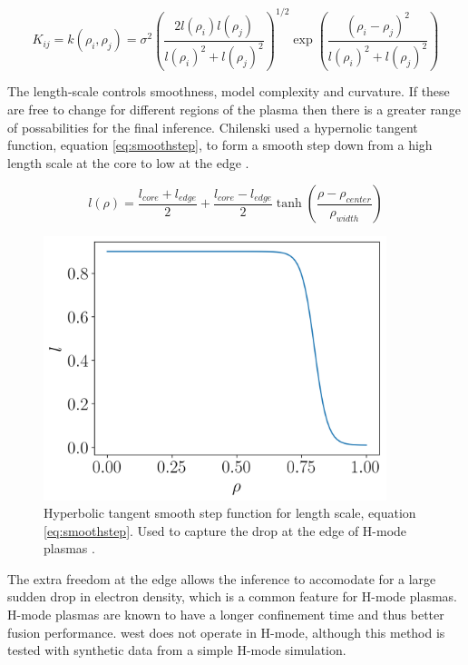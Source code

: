 \begin{equation}
  K_{ij} = k(\rho_i, \rho_j) = \sigma^2 \left( \frac{2l(\rho_i)l(\rho_j)}{l(\rho_i)^2 + l(\rho_j)^2} \right)^{1/2} \exp\left({\frac{(\rho_i - \rho_j)^2}{l(\rho_i)^2+l(\rho_j)^2}}\right)
\end{equation}

The length-scale controls smoothness, model complexity and curvature. If these are free to change for different regions of the plasma then there is a greater range of possabilities for the final inference. Chilenski used a hypernolic tangent function, equation \ref{eq:smoothstep}, to form a smooth step down from a high length scale at the core to low at the edge \cite{chilenski}.

\begin{equation}
  l(\rho) = \frac{l_{core} + l_{edge}}{2} + \frac{l_{core} - l_{edge}}{2} \tanh\left(\frac{\rho-\rho_{center}}{\rho_{width}}\right)
  \label{eq:smoothstep}
\end{equation}

\begin{figure}
  \centering
  \includegraphics[width=10cm]{images/smoothstep.png}
  \caption{Hyperbolic tangent smooth step function for length scale, equation \ref{eq:smoothstep}. Used to capture the drop at the edge of H-mode plasmas \cite{chilenski}.}
  \label{fig:smoothstep}
\end{figure}

The extra freedom at the edge allows the inference to accomodate for a large sudden drop in electron density, which is a common feature for H-mode plasmas. H-mode plasmas are known to have a longer confinement time and thus better fusion performance. \gls{west} does not operate in H-mode, although this method is tested with synthetic data from a simple H-mode simulation.

